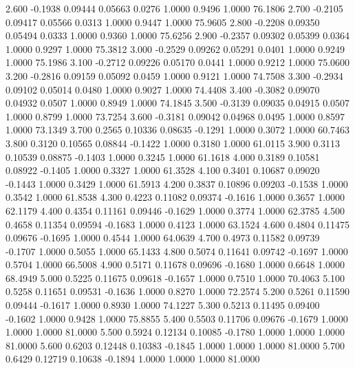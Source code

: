    2.600  -0.1938   0.09444   0.05663   0.0276   1.0000   0.9496   1.0000  76.1806
   2.700  -0.2105   0.09417   0.05566   0.0313   1.0000   0.9447   1.0000  75.9605
   2.800  -0.2208   0.09350   0.05494   0.0333   1.0000   0.9360   1.0000  75.6256
   2.900  -0.2357   0.09302   0.05399   0.0364   1.0000   0.9297   1.0000  75.3812
   3.000  -0.2529   0.09262   0.05291   0.0401   1.0000   0.9249   1.0000  75.1986
   3.100  -0.2712   0.09226   0.05170   0.0441   1.0000   0.9212   1.0000  75.0600
   3.200  -0.2816   0.09159   0.05092   0.0459   1.0000   0.9121   1.0000  74.7508
   3.300  -0.2934   0.09102   0.05014   0.0480   1.0000   0.9027   1.0000  74.4408
   3.400  -0.3082   0.09070   0.04932   0.0507   1.0000   0.8949   1.0000  74.1845
   3.500  -0.3139   0.09035   0.04915   0.0507   1.0000   0.8799   1.0000  73.7254
   3.600  -0.3181   0.09042   0.04968   0.0495   1.0000   0.8597   1.0000  73.1349
   3.700   0.2565   0.10336   0.08635  -0.1291   1.0000   0.3072   1.0000  60.7463
   3.800   0.3120   0.10565   0.08844  -0.1422   1.0000   0.3180   1.0000  61.0115
   3.900   0.3113   0.10539   0.08875  -0.1403   1.0000   0.3245   1.0000  61.1618
   4.000   0.3189   0.10581   0.08922  -0.1405   1.0000   0.3327   1.0000  61.3528
   4.100   0.3401   0.10687   0.09020  -0.1443   1.0000   0.3429   1.0000  61.5913
   4.200   0.3837   0.10896   0.09203  -0.1538   1.0000   0.3542   1.0000  61.8538
   4.300   0.4223   0.11082   0.09374  -0.1616   1.0000   0.3657   1.0000  62.1179
   4.400   0.4354   0.11161   0.09446  -0.1629   1.0000   0.3774   1.0000  62.3785
   4.500   0.4658   0.11354   0.09594  -0.1683   1.0000   0.4123   1.0000  63.1524
   4.600   0.4804   0.11475   0.09676  -0.1695   1.0000   0.4544   1.0000  64.0639
   4.700   0.4973   0.11582   0.09739  -0.1707   1.0000   0.5055   1.0000  65.1433
   4.800   0.5074   0.11641   0.09742  -0.1697   1.0000   0.5704   1.0000  66.5008
   4.900   0.5171   0.11678   0.09696  -0.1680   1.0000   0.6648   1.0000  68.4949
   5.000   0.5225   0.11675   0.09618  -0.1657   1.0000   0.7510   1.0000  70.4063
   5.100   0.5258   0.11651   0.09531  -0.1636   1.0000   0.8270   1.0000  72.2574
   5.200   0.5261   0.11590   0.09444  -0.1617   1.0000   0.8930   1.0000  74.1227
   5.300   0.5213   0.11495   0.09400  -0.1602   1.0000   0.9428   1.0000  75.8855
   5.400   0.5503   0.11706   0.09676  -0.1679   1.0000   1.0000   1.0000  81.0000
   5.500   0.5924   0.12134   0.10085  -0.1780   1.0000   1.0000   1.0000  81.0000
   5.600   0.6203   0.12448   0.10383  -0.1845   1.0000   1.0000   1.0000  81.0000
   5.700   0.6429   0.12719   0.10638  -0.1894   1.0000   1.0000   1.0000  81.0000
